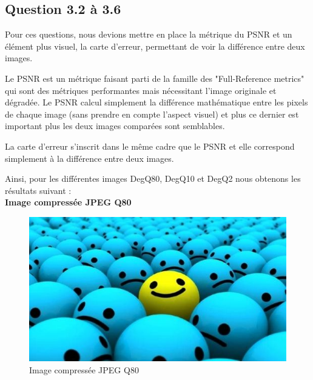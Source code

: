 \documentclass[12pt]{report}
\begin{document}
\subsection{Question 3.2 à 3.6}

Pour ces questions, nous devions mettre en place la métrique du PSNR et un élément plus visuel, la carte d'erreur, permettant de voir la différence entre deux images.

Le PSNR est un métrique faisant parti de la famille des "Full-Reference metrics" qui sont des métriques performantes mais nécessitant l'image originale et dégradée. Le PSNR calcul simplement la différence mathématique entre les pixels de chaque image (sans prendre en compte l'aspect visuel) et plus ce dernier est important plus les deux images comparées sont semblables.

La carte d'erreur s'inscrit dans le même cadre que le PSNR et elle correspond simplement à la différence entre deux images.

Ainsi, pour les différentes images DegQ80, DegQ10 et DegQ2 nous obtenons les résultats suivant :\\

\newpage
\textbf{Image compressée JPEG Q80}

\begin{figure}[H]
\begin{center}
\includegraphics[scale=0.5]{../smileyDegQ80.jpg} 
\caption{Image compressée JPEG Q80 }
\end{center}
\end{figure}
\end{document}
